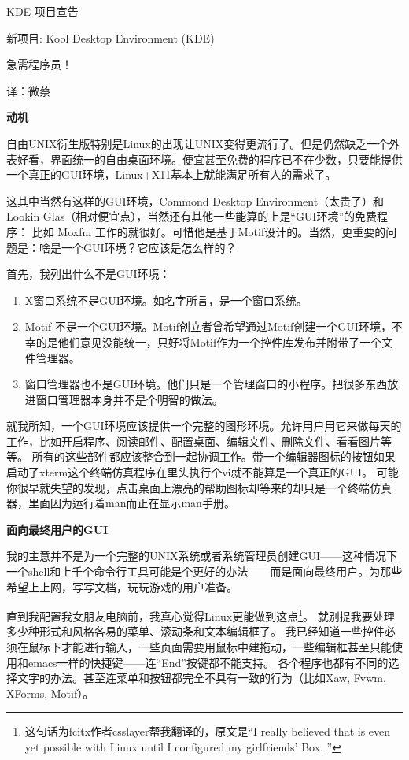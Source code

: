 \documentclass[amstex,twoside]{ctexbook}
\newenvironment{insertnote}{ \ttfamily\CJKfamily{KaiTi} }{\vskip 0.5cm }
\begin{document}
\begin{insertnote}


\begin{center}
KDE 项目宣告

新项目: Kool Desktop Environment (KDE)

{\scriptsize 急需程序员！}

{\footnotesize 译：微蔡}
\end{center}

{\large  \noindent \bf 动机}

自由UNIX衍生版特别是Linux的出现让UNIX变得更流行了。但是仍然缺乏一个外表好看，界面统一的自由桌面环境。便宜甚至免费的程序已不在少数，只要能提供一个真正的GUI环境，Linux+X11基本上就能满足所有人的需求了。

这其中当然有这样的GUI环境，Commond Desktop Environment（太贵了）和Lookin Glas（相对便宜点），当然还有其他一些能算的上是“GUI环境”的免费程序：
比如 Moxfm 工作的就很好。可惜他是基于Motif设计的。当然，更重要的问题是：啥是一个GUI环境？它应该是怎么样的？


首先，我列出什么不是GUI环境：

\begin{enumerate}
\item [\textbullet] X窗口系统不是GUI环境。如名字所言，是一个窗口系统。
\item [\textbullet] Motif 不是一个GUI环境。Motif创立者曾希望通过Motif创建一个GUI环境，不幸的是他们意见没能统一，只好将Motif作为一个控件库发布并附带了一个文件管理器。

\item [\textbullet] 窗口管理器也不是GUI环境。他们只是一个管理窗口的小程序。把很多东西放进窗口管理器本身并不是个明智的做法。
\end{enumerate}

就我所知，一个GUI环境应该提供一个完整的图形环境。允许用户用它来做每天的工作，比如开启程序、阅读邮件、配置桌面、编辑文件、删除文件、看看图片等等。
所有的这些部件都应该整合到一起协调工作。带一个编辑器图标的按钮如果启动了xterm这个终端仿真程序在里头执行个vi就不能算是一个真正的GUI。
可能你很早就失望的发现，点击桌面上漂亮的帮助图标却等来的却只是一个终端仿真器，里面因为运行着man而正在显示man手册。

{\large \noindent \bf 面向最终用户的GUI}

我的主意并不是为一个完整的UNIX系统或者系统管理员创建GUI——这种情况下一个shell和上千个命令行工具可能是个更好的办法——而是面向最终用户。为那些希望上上网，写写文档，玩玩游戏的用户准备。

直到我配置我女朋友电脑前，我真心觉得Linux更能做到这点\footnote{这句话为fcitx作者csslayer帮我翻译的，原文是“I really believed that is even yet possible with Linux until I configured my girlfriends' Box. ”}。
就别提我要处理多少种形式和风格各易的菜单、滚动条和文本编辑框了。
我已经知道一些控件必须在鼠标下才能进行输入，一些页面需要用鼠标中建拖动，一些编辑框甚至只能使用和emacs一样的快捷键——连“End”按键都不能支持。
各个程序也都有不同的选择文字的办法。甚至连菜单和按钮都完全不具有一致的行为（比如Xaw, Fvwm, XForms, Motif）。


\end{insertnote}
\end{document}

